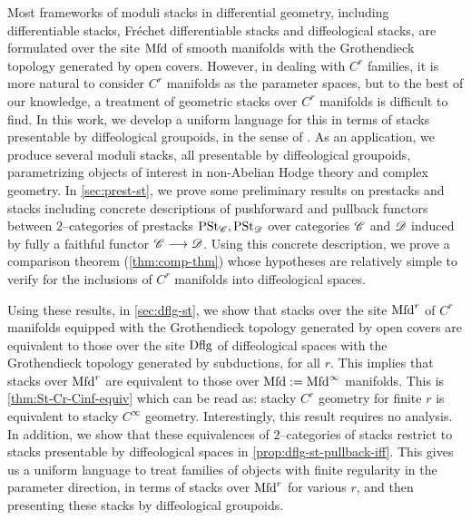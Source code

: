 \documentclass[11pt]{amsart}
\begin{document}
Most frameworks of moduli stacks in differential geometry, including differentiable stacks,
Fr\'echet differentiable stacks and diffeological stacks, are formulated
over the site $\mathrm{Mfd}$ of smooth manifolds with the Grothendieck topology generated by open covers.
However, in dealing with $C^r$ families, it is more natural to consider $C^r$ manifolds as the
parameter spaces, but to the best of
our knowledge, a treatment of geometric stacks over $C^r$ manifolds is difficult to find.
In this work, we develop a uniform language for this in terms of stacks presentable by diffeological
groupoids, in the sense of \cite{RV18}.
As an application, we produce several
moduli stacks, all presentable by diffeological groupoids, parametrizing objects of interest
in non-Abelian Hodge theory and complex geometry.
In \cref{sec:prest-st}, we prove some preliminary results on prestacks and stacks including
concrete descriptions of pushforward and pullback functors between $2$--categories
of prestacks $\mathrm{PSt}_\mathscr{C}, \mathrm{PSt}_\mathscr{D}$ over categories $\mathscr{C}$ and $\mathscr{D}$ induced by fully a faithful
functor $\sC \to \sD$. Using this concrete description, we prove a comparison
theorem (\cref{thm:comp-thm}) whose hypotheses are relatively simple to verify
for the inclusions of $C^r$ manifolds into diffeological spaces.

Using these results, in \cref{sec:dflg-st}, we show that stacks over the site $\mathrm{Mfd}^r$ of $C^r$
manifolds equipped with the Grothendieck topology generated by open covers are equivalent
to those over the site $\mathrm{Dflg}$ of diffeological spaces with the Grothendieck topology generated by
subductions, for all $r$.
This implies that stacks over $\mathrm{Mfd}^r$ are equivalent to those over
$\mathrm{Mfd} := \mathrm{Mfd}^\infty$ manifolds.
This is \cref{thm:St-Cr-Cinf-equiv} which can be read as: stacky $C^r$ geometry for finite $r$ is
equivalent to stacky $C^\infty$ geometry. Interestingly, this result requires no analysis.
In addition, we show that these equivalences of $2$--categories
of stacks restrict to stacks presentable by diffeological spaces in
\cref{prop:dflg-st-pullback-iff}.
This gives us a uniform language to treat families of objects with finite regularity in the
parameter direction, in terms of stacks over $\mathrm{Mfd}^r$ for various $r$, and then presenting
these stacks by diffeological groupoids.
\end{document}
